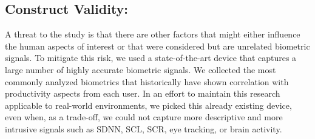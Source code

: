 \subsection{Construct Validity:}
A threat to the study is that
there are other factors that might either influence the
human aspects of interest or that were considered but
are unrelated biometric signals.
To mitigate this risk, we used a state-of-the-art
device that captures a large number of highly accurate biometric
signals. We collected the most commonly analyzed
biometrics that historically have shown correlation with 
productivity aspects from each user.
In an effort to maintain this research applicable to real-world environments, we picked this already existing device, even when, as a trade-off, we could not capture more descriptive and more intrusive signals such as SDNN, SCL, SCR, eye tracking, or brain activity.












